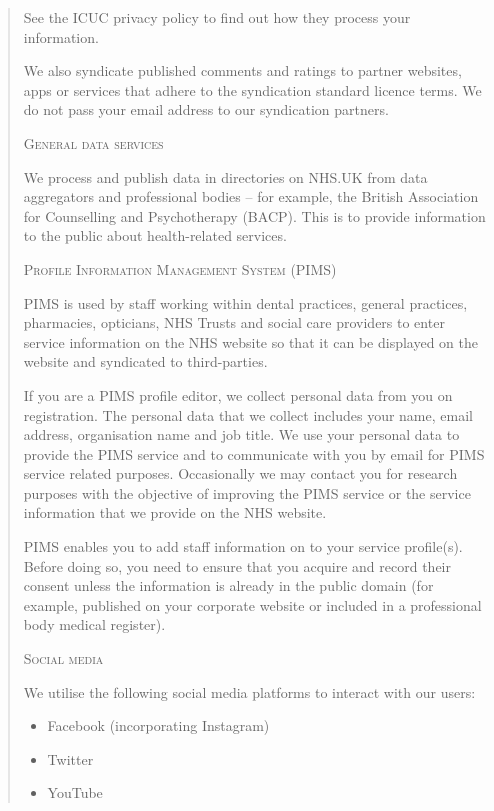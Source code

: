 \documentclass[twocolumn, letterpaper,13pt]{scrartcl}
\begin{document}
\begin{quote}
        See the ICUC privacy policy to find out how they process your information.
        
        We also syndicate published comments and ratings to partner websites, apps or services that adhere to the syndication standard licence terms. We do not pass your email address to our syndication partners.
        
        \textsc{General data services}
        
        We process and publish data in directories on NHS.UK from data aggregators and professional bodies – for example, the British Association for Counselling and Psychotherapy (BACP). This is to provide information to the public about health-related services.
        
        \textsc{Profile Information Management System (PIMS)}
        
        PIMS is used by staff working within dental practices, general practices, pharmacies, opticians, NHS Trusts and social care providers to enter service information on the NHS website so that it can be displayed on the website and syndicated to third-parties.
        
        If you are a PIMS profile editor, we collect personal data from you on registration. The personal data that we collect includes your name, email address, organisation name and job title. We use your personal data to provide the PIMS service and to communicate with you by email for PIMS service related purposes. Occasionally we may contact you for research purposes with the objective of improving the PIMS service or the service information that we provide on the NHS website.
        
        PIMS enables you to add staff information on to your service profile(s). Before doing so, you need to ensure that you acquire and record their consent unless the information is already in the public domain (for example, published on your corporate website or included in a professional body medical register).
        
        \textsc{Social media}
        
        We utilise the following social media platforms to interact with our users:
        
        \begin{itemize}
            \item Facebook (incorporating Instagram)
            \item Twitter
            \item YouTube
        \end{itemize}
        

\end{quote}
\end{document}
